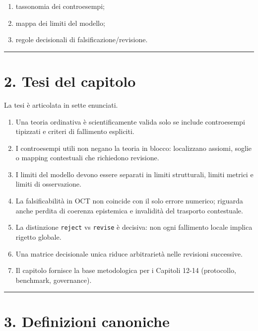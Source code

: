 \begin{enumerate}
\def\labelenumi{\arabic{enumi}.}
\tightlist
\item
  tassonomia dei controesempi;
\item
  mappa dei limiti del modello;
\item
  regole decisionali di falsificazione/revisione.
\end{enumerate}

\begin{center}\rule{0.5\linewidth}{0.5pt}\end{center}

\section{2. Tesi del capitolo}

La tesi è articolata in sette enunciati.

\begin{enumerate}
\def\labelenumi{\arabic{enumi}.}
\tightlist
\item
  Una teoria ordinativa è scientificamente valida solo se include controesempi tipizzati e criteri di fallimento espliciti.
\item
  I controesempi utili non negano la teoria in blocco: localizzano assiomi, soglie o mapping contestuali che richiedono revisione.
\item
  I limiti del modello devono essere separati in limiti strutturali, limiti metrici e limiti di osservazione.
\item
  La falsificabilità in OCT non coincide con il solo errore numerico; riguarda anche perdita di coerenza epistemica e invalidità del trasporto contestuale.
\item
  La distinzione \texttt{reject} vs \texttt{revise} è decisiva: non ogni fallimento locale implica rigetto globale.
\item
  Una matrice decisionale unica riduce arbitrarietà nelle revisioni successive.
\item
  Il capitolo fornisce la base metodologica per i Capitoli 12-14 (protocollo, benchmark, governance).
\end{enumerate}

\begin{center}\rule{0.5\linewidth}{0.5pt}\end{center}

\section{3. Definizioni canoniche}

